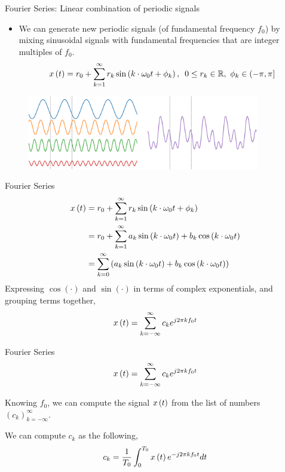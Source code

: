 \documentclass[aspectratio=169]{beamer}
\let\olditem\item
\renewcommand{\item}{\setlength{\itemsep}{\fill}\olditem}
\def\mb{\ensuremath\mathbb}
\def\lp{\ensuremath\left(}
\def\rp{\ensuremath\right)}
\def\rs{\ensuremath\right]}
\begin{document}
\begin{frame}[t]{Fourier Series: Linear combination of periodic signals}
\begin{itemize}
  \item We can generate new periodic signals (of fundamental frequency $f_0$) by mixing sinusoidal signals with fundamental frequencies that are integer multiples of $f_0$.
  \[ x\lp t \rp = r_0 + \sum_{k=1}^{\infty} r_k \sin\lp k\cdot \omega_0 t + \phi_k \rp, \,\,\, 0 \leq r_k \in \mb{R}, \,\, \phi_k \in \lp -\pi, \pi \rs \]
\end{itemize}
\vspace{-0.2cm}
\begin{figure}
\includegraphics[width=0.9\textwidth]{img/sinesums.eps}
\end{figure}
\end{frame}


\begin{frame}[t]{Fourier Series}
\[ \begin{split}
    x\lp t \rp &= r_0 + \sum_{k=1}^{\infty} r_k \sin\lp k\cdot \omega_0 t + \phi_k \rp \\
    &= r_0 + \sum_{k=1}^{\infty} a_k \sin\lp k\cdot \omega_0 t\rp + b_k \cos\lp k\cdot \omega_0 t\rp\\
    &= \sum_{k=0}^{\infty} \lp a_k \sin\lp k\cdot \omega_0 t\rp + b_k \cos\lp k\cdot \omega_0 t\rp \rp\\
    \end{split}
  \]
Expressing $\cos(\cdot)$ and $\sin(\cdot)$ in terms of complex exponentials, and grouping terms together,
\[ x\lp t \rp = \sum_{k=-\infty}^{\infty} c_k e^{j2\pi k f_0 t} \]
\end{frame}


\begin{frame}[t]{Fourier Series}
\[ x\lp t \rp = \sum_{k=-\infty}^{\infty} c_k e^{j2\pi k f_0 t} \]

Knowing $f_0$, we can compute the signal $x\lp t \rp$ from the list of numbers $(c_k)_{k=-\infty}^{\infty}$.

\vspace{1cm}

We can compute $c_k$ as the following,
\[ c_k = \frac{1}{T_0} \int_{0}^{T_0} x\lp t \rp e^{-j2\pi k f_0 t} dt \]
\end{frame}
\end{document}
